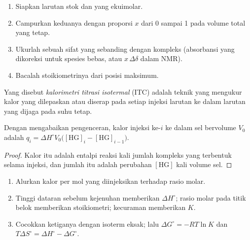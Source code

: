 \begin{method}\label{met:b3:supramolecular:job}
\begin{enumerate}
  \item Siapkan larutan stok  dan  yang ekuimolar.
  \item Campurkan keduanya dengan proporsi $x$ dari 0 sampai 1 pada volume total yang tetap.
  \item Ukurlah sebuah sifat yang sebanding dengan kompleks (absorbansi yang dikoreksi
        untuk spesies bebas, atau $x\,\Delta\delta$ dalam NMR).
  \item Bacalah stoikiometrinya dari posisi maksimum.
\end{enumerate}
\end{method}

\begin{definition}\label{def:b3:supramolecular:itc}
Yang disebut \emph{kalorimetri titrasi isotermal}
(ITC) adalah teknik yang mengukur kalor yang dilepaskan atau diserap pada setiap injeksi larutan 
ke dalam larutan  yang dijaga pada suhu tetap.
\end{definition}

\begin{proposition}\label{prop:b3:supramolecular:itc}
Dengan mengabaikan pengenceran, kalor injeksi ke-$i$ ke dalam sel bervolume $V_0$ adalah
$q_i = \Delta H^\circ V_0\bigl([\mathrm{HG}]_i - [\mathrm{HG}]_{i-1}\bigr)$.
\end{proposition}

\begin{proof}
Kalor itu adalah entalpi reaksi kali jumlah kompleks yang terbentuk selama
injeksi, dan jumlah itu adalah perubahan $[\mathrm{HG}]$ kali volume sel.
\end{proof}

\begin{method}\label{met:b3:supramolecular:itc}
\begin{enumerate}
  \item Alurkan kalor per mol  yang diinjeksikan terhadap rasio molar.
  \item Tinggi dataran sebelum kejenuhan memberikan $\Delta H^\circ$; rasio molar pada
        titik belok memberikan stoikiometri; kecuraman memberikan $K$.
  \item Cocokkan ketiganya dengan isoterm eksak; lalu $\Delta G^\circ = -RT\ln K$ dan
        $T\Delta S^\circ = \Delta H^\circ - \Delta G^\circ$.
\end{enumerate}
\end{method}

